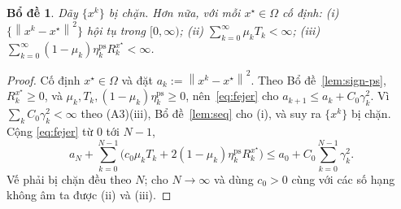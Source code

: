 \documentclass[]{interact}
\theoremstyle{plain}
\newtheorem{lemma}[theorem]{Bổ đề}
\theoremstyle{definition}
\theoremstyle{remark}
\newcommand{\norm}[1]{\left\lVert #1 \right\rVert}
\newcommand{\ps}{\mathrm{ps}}
\begin{document}
\begin{lemma}\label{lem:bounded}
Dãy $\{x^k\}$ bị chặn. Hơn nữa, với mỗi $x^\star\in\Omega$ cố định:
\textup{(i)} $\{\norm{x^k-x^\star}^2\}$ hội tụ trong $[0,\infty)$;
\textup{(ii)} $\sum_{k=0}^\infty\mu_k T_k<\infty$;
\textup{(iii)} $\sum_{k=0}^\infty(1-\mu_k)\eta^{\ps}_k R^{x^\star}_k<\infty$.
\end{lemma}
\begin{proof}
Cố định $x^\star\in\Omega$ và đặt $a_k:=\norm{x^k-x^\star}^2$. Theo Bổ đề~\ref{lem:sign-ps},
$R^{x^\star}_k\ge0$, và $\mu_k,T_k,(1-\mu_k)\eta^{\ps}_k\ge0$, nên~\eqref{eq:fejer} cho
$a_{k+1}\le a_k+C_0\gamma_k^2$. Vì $\sum_k C_0\gamma_k^2<\infty$ theo (A3)(iii),
Bổ đề~\ref{lem:seq} cho (i), và suy ra $\{x^k\}$ bị chặn. Cộng
\eqref{eq:fejer} từ $0$ tới $N-1$,
\[
a_N+\sum_{k=0}^{N-1}\bigl(c_0\mu_k T_k+2(1-\mu_k)\eta^{\ps}_k R^{x^\star}_k\bigr)\le a_0+C_0\sum_{k=0}^{N-1}\gamma_k^2 .
\]
Vế phải bị chặn đều theo $N$; cho $N\to\infty$ và dùng $c_0>0$ cùng với
các số hạng không âm ta được (ii) và (iii).
\end{proof}
\end{document}
